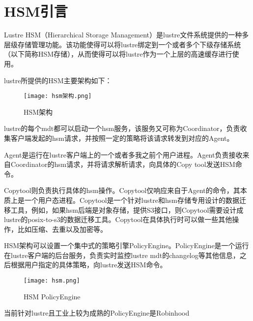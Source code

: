 \section{HSM引言}

Lustre HSM（Hierarchical Storage Management）是lustre文件系统提供的一种多层级存储管理功能。该功能使得可以将lustre绑定到一个或者多个下级存储系统（以下简称HSM存储），从而使得可以将lustre作为一个上层的高速缓存进行使用。 

lustre所提供的HSM主要架构如下： 

\begin{figure}[!htb]
    \centering
    \texttt{[image: hsm架构.png]}
    \caption{HSM架构}\label{fig:region-image}
\end{figure}

lustre的每个mdt都可以启动一个hsm服务，该服务又可称为Coordinator，负责收集客户端发起的hsm请求，并按照一定的策略将该请求转发到对应的Agent。 

Agent是运行在lustre客户端上的一个或者多我之前个用户进程。Agent负责接收来自Coordinator的hsm请求，并将请求解析请求，向具体的Copy tool发送HSM命令。 

Copytool则负责执行具体的hsm操作。Copytool仅响应来自于Agent的命令，其本质上是一个用户态进程。Copytool是一个针对lustre和hsm存储专用设计的数据迁移工具，例如，如果hsm后端是对象存储，提供S3接口，则Copytool需要设计成lustre的posix-to-s3的数据迁移工具。Copytool在具体执行时可以做一些其他操作，比如压缩、去重以及加密等。 

HSM架构可以设置一个集中式的策略引擎PolicyEngine。PolicyEngine是一个运行在lustre客户端的后台服务，负责实时监控lustre mdt的changelog等其他信息，之后根据用户指定的具体策略，向lustre发送HSM命令。 

\begin{figure}[!htb]
    \centering
    \texttt{[image: hsm.png]}
    \caption{HSM PolicyEngine}\label{fig:region-image}
\end{figure}

当前针对lustre且工业上较为成熟的PolicyEngine是Robinhood





